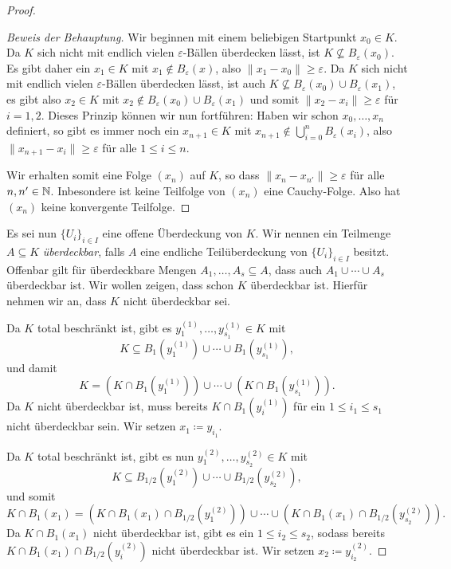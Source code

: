 \documentclass[a4paper,10pt]{article}
\begin{document}
\begin{proof}
\begin{proof}[Beweis der Behauptung]
  Wir beginnen mit einem beliebigen Startpunkt $x_0 \in K$. Da $K$ sich nicht mit endlich vielen $\varepsilon$-Bällen überdecken lässt, ist $K \nsubseteq B_\varepsilon(x_0)$. Es gibt daher ein $x_1 \in K$ mit $x_1 \notin B_\varepsilon(x)$, also $\|x_1 - x_0\| \geq \varepsilon$. Da $K$ sich nicht mit endlich vielen $\varepsilon$-Bällen überdecken lässt, ist auch $K \nsubseteq B_\varepsilon(x_0) \cup B_\varepsilon(x_1)$, es gibt also $x_2 \in K$ mit $x_2 \notin B_\varepsilon(x_0) \cup B_\varepsilon(x_1)$ und somit $\|x_2 - x_i\| \geq \varepsilon$ für $i = 1, 2$. Dieses Prinzip können wir nun fortführen: Haben wir schon $x_0, \dotsc, x_n$ definiert, so gibt es immer noch ein $x_{n+1} \in K$ mit $x_{n+1} \notin \bigcup_{i=0}^n B_\varepsilon(x_i)$, also $\|x_{n+1} - x_i\| \geq \varepsilon$ für alle $1 \leq i \leq n$.
  
  Wir erhalten somit eine Folge $(x_n)$ auf $K$, so dass $\|x_n - x_{n'}\| \geq \varepsilon$ für alle $n, n' \in \mathbb{N}$. Inbesondere ist keine Teilfolge von $(x_n)$ eine Cauchy-Folge. Also hat $(x_n)$ keine konvergente Teilfolge.
 \end{proof}
 
 
 Es sei nun $\{U_i\}_{i \in I}$ eine offene Überdeckung von $K$. Wir nennen ein Teilmenge $A \subseteq K$ \emph{überdeckbar}, falls $A$ eine endliche Teilüberdeckung von $\{U_i\}_{i \in I}$ besitzt. Offenbar gilt für überdeckbare Mengen $A_1, \dotsc, A_s \subseteq A$, dass auch $A_1 \cup \dotsb \cup A_s$ überdeckbar ist. Wir wollen zeigen, dass schon $K$ überdeckbar ist. Hierfür nehmen wir an, dass $K$ nicht überdeckbar sei.
 
 Da $K$ total beschränkt ist, gibt es $y^{(1)}_1, \dotsc, y^{(1)}_{s_1} \in K$ mit
 \[
  K \subseteq B_1\left(y^{(1)}_1\right) \cup \dotsb \cup B_1\left(y^{(1)}_{s_1}\right),
 \]
 und damit
 \[
  K = \left(K \cap B_1\left(y^{(1)}_1\right)\right) \cup \dotsb \cup \left(K \cap B_1\left(y^{(1)}_{s_1}\right)\right).
 \]
 Da $K$ nicht überdeckbar ist, muss bereits $K \cap B_1(y^{(1)}_i)$ für ein $1 \leq i_1 \leq s_1$ nicht überdeckbar sein. Wir setzen $x_1 \coloneqq y_{i_1}$.
 
 Da $K$ total beschränkt ist, gibt es nun $y^{(2)}_1, \dotsc, y^{(2)}_{s_2} \in K$ mit
 \[
  K \subseteq B_{1/2}\left(y^{(2)}_1\right) \cup \dotsb \cup B_{1/2}\left(y^{(2)}_{s_2}\right),
 \]
 und somit
 \[
  K \cap B_1(x_1)
  = \left(K \cap B_1(x_1) \cap B_{1/2}\left(y^{(2)}_1\right)\right) \cup \dotsb \cup \left(K \cap B_1(x_1) \cap B_{1/2}\left(y^{(2)}_{s_2}\right)\right).
 \]
 Da $K \cap B_1(x_1)$ nicht überdeckbar ist, gibt es ein $1 \leq i_2 \leq s_2$, sodass bereits $K \cap B_1(x_1) \cap B_{1/2}(y^{(2)}_i)$ nicht überdeckbar ist. Wir setzen $x_2 \coloneqq y^{(2)}_{i_2}$.
 

\end{proof}
\end{document}

